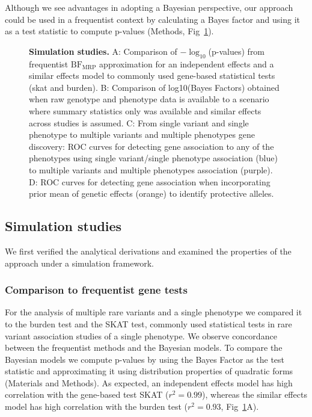 Although we see advantages in adopting a Bayesian perspective, our approach could be used in a frequentist context by calculating a Bayes factor and using it as a test statistic to compute p-values (Methods, Fig~\ref{fig2}).
 
\begin{figure}[!h]
\caption{{\bf Simulation studies.}
A: Comparison of $-\log_{10}$(p-values) from frequentist $\textrm{BF}_{\textrm{MRP}}$ approximation for an independent effects and a similar effects model to commonly used gene-based statistical tests (skat and burden). B: Comparison of log10(Bayes Factors) obtained when raw genotype and phenotype data is available to a scenario where summary statistics only was available and similar effects across studies is assumed. C: From single variant and single phenotype to multiple variants and multiple phenotypes gene discovery: ROC curves for detecting gene association to any of the phenotypes using single variant/single phenotype association (blue) to multiple variants and multiple phenotypes association (purple). D: ROC curves for detecting gene association when incorporating prior mean of genetic effects (orange) to identify protective alleles.}
\label{fig2}
\end{figure}

\subsection*{Simulation studies}
We first verified the analytical derivations and examined the properties of the approach under a simulation framework. 

\subsubsection*{Comparison to frequentist gene tests}
For the analysis of multiple rare variants and a single phenotype we compared it to the burden test and the SKAT test, commonly used statistical tests in rare variant association studies of a single phenotype. We observe concordance between the frequentist methods and the Bayesian models. To compare the Bayesian models we compute p-values by using the Bayes Factor as the test statistic and approximating it using distribution properties of quadratic forms (Materials and Methods). As expected, an independent effects model has high correlation with the gene-based test SKAT ($r^2 = 0.99$), whereas the similar effects model has high correlation with the burden test ($r^2 = 0.93$, Fig~\ref{fig2}A). 

